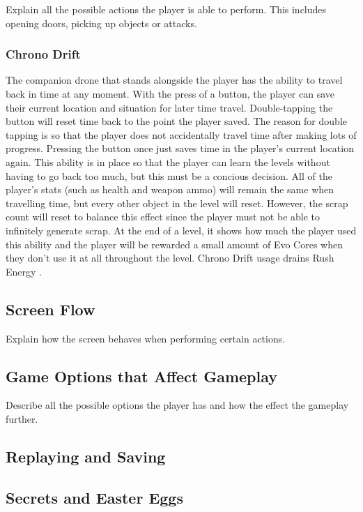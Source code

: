 \documentclass[12pt]{article}
\begin{document}
Explain all the possible actions the player is able to perform. This includes opening doors, picking up objects or attacks.

\subsubsection{Chrono Drift}

The companion drone that stands alongside the player has the ability to travel back in time at any moment. With the press of a button, the player can save their current location and situation for later time travel. Double-tapping the button will reset time back to the point the player saved. The reason for double tapping is so that the player does not accidentally travel time after making lots of progress. Pressing the button once just saves time in the player's current location again. This ability is in place so that the player can learn the levels without having to go back too much, but this must be a concious decision. All of the player's stats (such as health and weapon ammo) will remain the same when travelling time, but every other object in the level will reset. However, the scrap count will reset to balance this effect since the player must not be able to infinitely generate scrap. At the end of a level, it shows how much the player used this ability and the player will be rewarded a small amount of Evo Cores when they don't use it at all throughout the level. Chrono Drift usage drains Rush Energy .

\subsection{Screen Flow}

Explain how the screen behaves when performing certain actions.

\subsection{Game Options that Affect Gameplay}

Describe all the possible options the player has and how the effect the gameplay further. 

\subsection{Replaying and Saving}

\subsection{Secrets and Easter Eggs}
\end{document}
